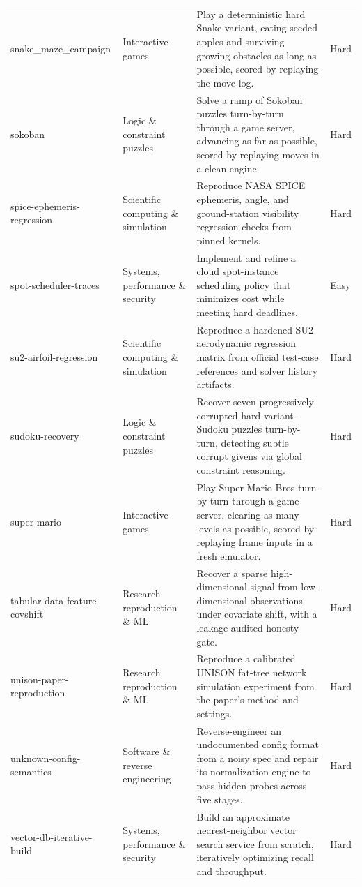 \begin{longtable}{p{}p{}p{}p{}}
snake\_maze\_campaign & Interactive games & Play a deterministic hard Snake variant, eating seeded apples and surviving growing obstacles as long as possible, scored by replaying the move log. & Hard \\
sokoban & Logic \& constraint puzzles & Solve a ramp of Sokoban puzzles turn-by-turn through a game server, advancing as far as possible, scored by replaying moves in a clean engine. & Hard \\
spice-ephemeris-regression & Scientific computing \& simulation & Reproduce NASA SPICE ephemeris, angle, and ground-station visibility regression checks from pinned kernels. & Hard \\
spot-scheduler-traces & Systems, performance \& security & Implement and refine a cloud spot-instance scheduling policy that minimizes cost while meeting hard deadlines. & Easy \\
su2-airfoil-regression & Scientific computing \& simulation & Reproduce a hardened SU2 aerodynamic regression matrix from official test-case references and solver history artifacts. & Hard \\
sudoku-recovery & Logic \& constraint puzzles & Recover seven progressively corrupted hard variant-Sudoku puzzles turn-by-turn, detecting subtle corrupt givens via global constraint reasoning. & Hard \\
super-mario & Interactive games & Play Super Mario Bros turn-by-turn through a game server, clearing as many levels as possible, scored by replaying frame inputs in a fresh emulator. & Hard \\
tabular-data-feature-covshift & Research reproduction \& ML & Recover a sparse high-dimensional signal from low-dimensional observations under covariate shift, with a leakage-audited honesty gate. & Hard \\
unison-paper-reproduction & Research reproduction \& ML & Reproduce a calibrated UNISON fat-tree network simulation experiment from the paper's method and settings. & Hard \\
unknown-config-semantics & Software \& reverse engineering & Reverse-engineer an undocumented config format from a noisy spec and repair its normalization engine to pass hidden probes across five stages. & Hard \\
vector-db-iterative-build & Systems, performance \& security & Build an approximate nearest-neighbor vector search service from scratch, iteratively optimizing recall and throughput. & Hard \\
\end{longtable}
\normalsize
